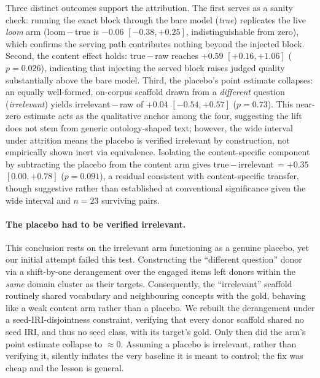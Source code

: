\documentclass[10pt,twocolumn]{article}
\begin{document}


Three distinct outcomes support the attribution. The first serves as a sanity check: running the exact block through the bare model (\emph{true}) replicates the live \emph{loom} arm (loom\,$-$\,true is $-0.06$ $[-0.38,+0.25]$, indistinguishable from zero), which confirms the serving path contributes nothing beyond the injected block. Second, the content effect holds: true\,$-$\,raw reaches $+0.59$ $[+0.16,+1.06]$ ($p=0.026$), indicating that injecting the served block raises judged quality substantially above the bare model. Third, the placebo’s point estimate collapses: an equally well-formed, on-corpus scaffold drawn from a \emph{different} question (\emph{irrelevant}) yields irrelevant\,$-$\,raw of $+0.04$ $[-0.54,+0.57]$ ($p=0.73$). This near-zero estimate acts as the qualitative anchor among the four, suggesting the lift does not stem from generic ontology-shaped text; however, the wide interval under attrition means the placebo is verified irrelevant by construction, not empirically shown inert via equivalence. Isolating the content-specific component by subtracting the placebo from the content arm gives true\,$-$\,irrelevant\,$=+0.35$ $[0.00,+0.78]$ ($p=0.091$), a residual consistent with content-specific transfer, though suggestive rather than established at conventional significance given the wide interval and $n=23$ surviving pairs.

\paragraph{The placebo had to be verified irrelevant.} This conclusion rests on the irrelevant arm functioning as a genuine placebo, yet our initial attempt failed this test. Constructing the “different question” donor via a shift-by-one derangement over the engaged items left donors within the \emph{same} domain cluster as their targets. Consequently, the “irrelevant” scaffold routinely shared vocabulary and neighbouring concepts with the gold, behaving like a weak content arm rather than a placebo. We rebuilt the derangement under a seed-IRI-disjointness constraint, verifying that every donor scaffold shared no seed IRI, and thus no seed class, with its target's gold. Only then did the arm's point estimate collapse to $\approx0$. Assuming a placebo is irrelevant, rather than verifying it, silently inflates the very baseline it is meant to control; the fix was cheap and the lesson is general.
\end{document}
